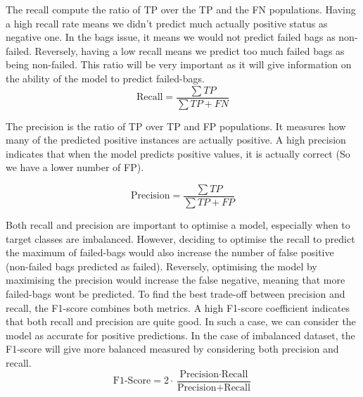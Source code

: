 \documentclass[12pt]{article}
\begin{document}
The recall compute the ratio of TP over the TP and the FN populations. Having a high recall rate means we didn't predict much actually positive status as negative one. In the bags issue, it means we would not predict failed bags as non-failed. Reversely, having a low recall means we predict too much failed bags as being non-failed. This ratio will be very important as it will give information on the ability of the model to predict failed-bags.
\begin{equation}\label{equation:Recall}
\text{Recall} = \frac{\sum{TP}}{\sum{TP + FN}}    
\end{equation}

The precision is the ratio of TP over TP and FP populations. It measures how many of the predicted positive instances are actually positive. A high precision indicates that when the model predicts positive values, it is actually correct (So we have a lower number of FP).

\begin{equation}\label{equation:Precision}
\text{Precision} = \frac{\sum{TP}}{\sum{TP + FP}}
\end{equation}

Both recall and precision are important to optimise a model, especially when to target classes are imbalanced. However, deciding to optimise the recall to predict the maximum of failed-bags would also increase the number of false positive (non-failed bags predicted as failed). Reversely, optimising the model by maximising the precision would increase the false negative, meaning that more failed-bags wont be predicted. 
To find the best trade-off between precision and recall, the F1-score combines both metrics. A high F1-score coefficient indicates that both recall and precision are quite good. In such a case, we can consider the model as accurate for positive predictions. In the case of imbalanced dataset, the F1-score will give more balanced measured by considering both precision and recall. 
\begin{equation}\label{equation:F1-score}
\text{F1-Score} = 2 \cdot \frac{\text{Precision} \cdot \text{Recall}}{\text{Precision} + \text{Recall}}    
\end{equation}

\newcommand{\mycomment}[1]{}
\end{document}
